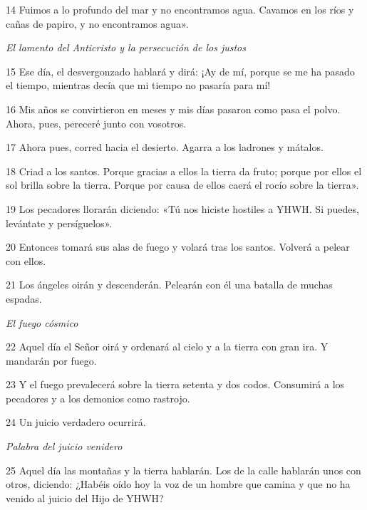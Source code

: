 \par 14 Fuimos a lo profundo del mar y no encontramos agua. Cavamos en los ríos y cañas de papiro, y no encontramos agua».


\par \textit{El lamento del Anticristo y la persecución de los justos}


\par 15 Ese día, el desvergonzado hablará y dirá: ¡Ay de mí, porque se me ha pasado el tiempo, mientras decía que mi tiempo no pasaría para mí!

\par 16 Mis años se convirtieron en meses y mis días pasaron como pasa el polvo. Ahora, pues, pereceré junto con vosotros.

\par 17 Ahora pues, corred hacia el desierto. Agarra a los ladrones y mátalos.

\par 18 Criad a los santos. Porque gracias a ellos la tierra da fruto; porque por ellos el sol brilla sobre la tierra. Porque por causa de ellos caerá el rocío sobre la tierra».

\par 19 Los pecadores llorarán diciendo: «Tú nos hiciste hostiles a YHWH. Si puedes, levántate y persíguelos».

\par 20 Entonces tomará sus alas de fuego y volará tras los santos. Volverá a pelear con ellos.

\par 21 Los ángeles oirán y descenderán. Pelearán con él una batalla de muchas espadas.

\par \textit{El fuego cósmico}

\par 22 Aquel día el Señor oirá y ordenará al cielo y a la tierra con gran ira. Y mandarán por fuego.

\par 23 Y el fuego prevalecerá sobre la tierra setenta y dos codos. Consumirá a los pecadores y a los demonios como rastrojo.

\par 24 Un juicio verdadero ocurrirá.

\par \textit{Palabra del juicio venidero}

\par 25 Aquel día las montañas y la tierra hablarán. Los de la calle hablarán unos con otros, diciendo: ¿Habéis oído hoy la voz de un hombre que camina y que no ha venido al juicio del Hijo de YHWH?


